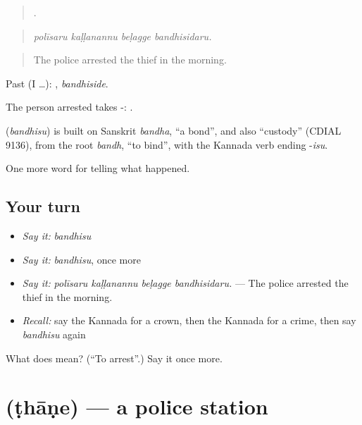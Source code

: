 \begin{quote}
   .
\end{quote}

\begin{quote}
\emph{polīsaru kaḷḷanannu beḷagge bandhisidaru.}
\end{quote}

\begin{quote}
The police arrested the thief in the morning.
\end{quote}

Past (I …): , \emph{bandhiside}.

The person arrested takes -:  .

\begin{cousinweb}
\textbf{} (\emph{bandhisu}) is built on Sanskrit \emph{bandha}, \textquotedblleft{}a bond\textquotedblright{}, and also \textquotedblleft{}custody\textquotedblright{} (CDIAL 9136), from the root \emph{bandh}, \textquotedblleft{}to bind\textquotedblright{}, with the Kannada verb ending -\emph{isu}.
\end{cousinweb}

\begin{grammarlens}[title={What you've built}]
One more word for telling what happened.
\end{grammarlens}

\subsection*{Your turn}
\begin{itemize}
\raggedright
  \item \emph{Say it:} \emph{bandhisu}
  \item \emph{Say it:} \emph{bandhisu}, once more
  \item \emph{Say it:} \emph{polīsaru kaḷḷanannu beḷagge bandhisidaru.} — The police arrested the thief in the morning.
  \item \emph{Recall:} say the Kannada for a crown, then the Kannada for a crime, then say \emph{bandhisu} again
\end{itemize}

\begin{tcolorbox}[breakable,colback=teal!4,colframe=teal!35!black,title={Before you move on}]
What does  mean? (\textquotedblleft{}To arrest\textquotedblright{}.) Say it once more.
\end{tcolorbox}
\section[\texorpdfstring{\kn{ಠಾಣೆ} (ṭhāṇe)}{ಠಾಣೆ (ṭhāṇe)}]{ (ṭhāṇe) — a police station}

